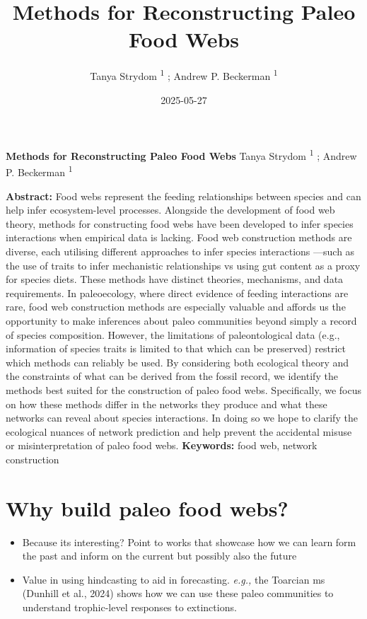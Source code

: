 \documentclass[
]{article}
\title{Methods for Reconstructing Paleo Food Webs}
\author{Tanya Strydom %
%
\textsuperscript{%
%
1%
}%
; Andrew P. Beckerman %
%
\textsuperscript{%
%
1%
}%
}
\date{2025-05-27}
\begin{document}
\thispagestyle{empty}
{\bfseries\sffamily\Large Methods for Reconstructing Paleo Food Webs}
\vfil
Tanya Strydom %
%
\textsuperscript{%
%
1%
}%
; Andrew P. Beckerman %
%
\textsuperscript{%
%
1%
}%

\vfil
{\small
\textbf{Abstract:} Food webs represent the feeding relationships between
species and can help infer ecosystem-level processes. Alongside the
development of food web theory, methods for constructing food webs have
been developed to infer species interactions when empirical data is
lacking. Food web construction methods are diverse, each utilising
different approaches to infer species interactions ---such as the use of
traits to infer mechanistic relationships vs using gut content as a
proxy for species diets. These methods have distinct theories,
mechanisms, and data requirements. In paleoecology, where direct
evidence of feeding interactions are rare, food web construction methods
are especially valuable and affords us the opportunity to make
inferences about paleo communities beyond simply a record of species
composition. However, the limitations of paleontological data (e.g.,
information of species traits is limited to that which can be preserved)
restrict which methods can reliably be used. By considering both
ecological theory and the constraints of what can be derived from the
fossil record, we identify the methods best suited for the construction
of paleo food webs. Specifically, we focus on how these methods differ
in the networks they produce and what these networks can reveal about
species interactions. In doing so we hope to clarify the ecological
nuances of network prediction and help prevent the accidental misuse or
misinterpretation of paleo food webs.
\vfil
\textbf{Keywords:} %
food web, %
network construction%
}
\clearpage
\setcounter{page}{1}
\doublespacing
\linenumbers


\section{Why build paleo food webs?}\label{why-build-paleo-food-webs}

\begin{itemize}
\item
  Because its interesting? Point to works that showcase how we can learn
  form the past and inform on the current but possibly also the future
\item
  Value in using hindcasting to aid in forecasting. \emph{e.g.,} the
  Toarcian ms (Dunhill et al., 2024) shows how we can use these paleo
  communities to understand trophic-level responses to extinctions.
\end{itemize}
\end{document}
